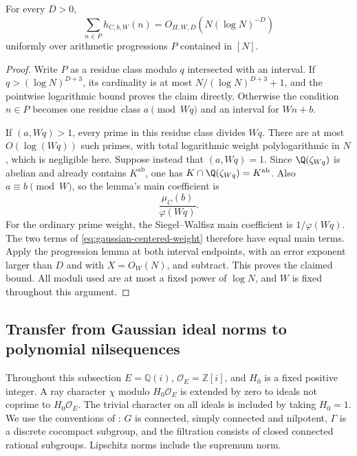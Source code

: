 \begin{corollary}
\label{cor:gaussian-centered-progressions}
For every $D>0$,
\[
       \sum_{n\in P}h_{C,b,W}(n)=O_{H,W,D}(N(\log N)^{-D})
\]
uniformly over arithmetic progressions $P$ contained in $[N]$.
\end{corollary}
\begin{proof}
Write $P$ as a residue class modulo $q$ intersected with an interval.
If $q>(\log N)^{D+3}$, its cardinality is at most
$N/(\log N)^{D+3}+1$, and the pointwise logarithmic bound proves the
claim directly.  Otherwise the condition $n\in P$ becomes one residue
class $a\pmod{Wq}$ and an interval for $Wn+b$.

If $(a,Wq)>1$, every prime in this residue class divides $Wq$.  There
are at most $O(\log(Wq))$ such primes, with total logarithmic weight
polylogarithmic in $N$, which is negligible here.  Suppose instead that
$(a,Wq)=1$.
Since $\Q(\zeta_{Wq})$ is abelian and already contains
$K^{\mathrm{ab}}$, one has
$K\cap\Q(\zeta_{Wq})=K^{\mathrm{ab}}$.
Also $a\equiv b\pmod W$, so the lemma's main coefficient is
\[
   \frac{\mu_C(b)}{\varphi(Wq)}.
\]
For the ordinary prime weight, the Siegel--Walfisz main coefficient
is $1/\varphi(Wq)$.  The two terms of
\eqref{eq:gaussian-centered-weight} therefore have equal main terms.
Apply the progression lemma at both interval endpoints, with an error
exponent larger than $D$ and with $X=O_W(N)$, and subtract.  This proves
the claimed bound.  All moduli used are at most a fixed power of
$\log N$, and $W$ is fixed throughout this argument.
\end{proof}


\subsection{Transfer from Gaussian ideal norms to polynomial nilsequences}
\label{sec:gn-transfer}

Throughout this subsection $E=\mathbb Q(i)$, $\mathcal O_E=\mathbb Z[i]$,
and $H_0$ is a fixed positive integer. A ray character $\chi$ modulo
$H_0\mathcal O_E$ is extended by zero to ideals not coprime to
$H_0\mathcal O_E$. The trivial character on all ideals is included by
taking $H_0=1$. We use the conventions of \cite{GTOrbits2012}: $G$ is
connected, simply connected and nilpotent, $\Gamma$ is a discrete cocompact
subgroup, and the filtration consists of closed connected rational
subgroups. Lipschitz norms include the supremum norm.

